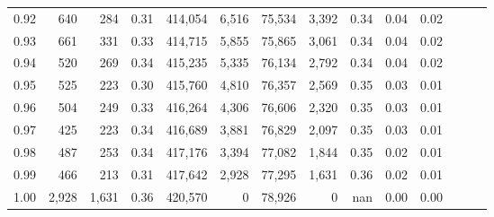 \begin{tabular}{rrrrrrrrrrrrrr}
0.92 &    640 &    284 &  0.31 &  414,054 &    6,516 &  75,534 &   3,392 &  0.34 &  0.04 &      0.02 \\
0.93 &    661 &    331 &  0.33 &  414,715 &    5,855 &  75,865 &   3,061 &  0.34 &  0.04 &      0.02 \\
0.94 &    520 &    269 &  0.34 &  415,235 &    5,335 &  76,134 &   2,792 &  0.34 &  0.04 &      0.02 \\
0.95 &    525 &    223 &  0.30 &  415,760 &    4,810 &  76,357 &   2,569 &  0.35 &  0.03 &      0.01 \\
0.96 &    504 &    249 &  0.33 &  416,264 &    4,306 &  76,606 &   2,320 &  0.35 &  0.03 &      0.01 \\
0.97 &    425 &    223 &  0.34 &  416,689 &    3,881 &  76,829 &   2,097 &  0.35 &  0.03 &      0.01 \\
0.98 &    487 &    253 &  0.34 &  417,176 &    3,394 &  77,082 &   1,844 &  0.35 &  0.02 &      0.01 \\
0.99 &    466 &    213 &  0.31 &  417,642 &    2,928 &  77,295 &   1,631 &  0.36 &  0.02 &      0.01 \\
1.00 &  2,928 &  1,631 &  0.36 &  420,570 &        0 &  78,926 &       0 &   nan &  0.00 &      0.00 \\
\bottomrule
\end{tabular}
